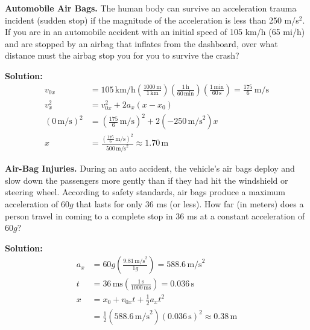 \documentclass[12pt]{article}
\newenvironment{problem}[2][]{
    \begin{trivlist}
        \item[
            {\bfseries #1}
            {\bfseries #2}
        ]
}{\end{trivlist}}
\newcommand{\solution}{\medskip\noindent\textbf{Solution:}}
\newcommand{\unit}[1]{\, \text{#1}}
\newcommand{\m}{\unit{m}}
\newcommand{\km}{\unit{km}}
\newcommand{\kmh}{\unit{km/h}}
\newcommand{\mps}{\unit{m/s}}
\newcommand{\ms}{\unit{ms}}
\newcommand{\s}{\unit{s}}
\newcommand{\Hour}{\unit{h}}
\newcommand{\minute}{\unit{min}}
\begin{document}
\clearpage

\begin{problem}{2.23}
    \textbf{Automobile Air Bags.} The human body can survive an acceleration trauma incident (sudden stop) if the magnitude of the acceleration is less than 250 m/s$^2$.
    If you are in an automobile accident with an initial speed of 105 km/h (65 mi/h) and are stopped by an airbag that inflates from the dashboard, over what distance must the airbag stop you for you to survive the crash?
    
    \solution
    \begin{align}
        v_{0x} &= 105 \kmh \left(\frac{1000 \m}{1 \km}\right) \left(\frac{1 \Hour}{60 \minute}\right) \left(\frac{1 \minute}{60 \s}\right) = \frac{175}{6} \mps \\
        v_x^2 &= v_{0x}^2 + 2a_x \left(x - x_0\right) \\
        \left(0 \mps\right)^2 &= \left(\frac{175}{6} \mps\right)^2 + 2 \left(-250 \mps^2\right) x \\
        x &= \frac{\left(\frac{175}{6} \mps\right)^2}{500 \mps^2} \approx 1.70 \m
    \end{align}
\end{problem}

\bigskip

\begin{problem}{2.25}
    \textbf{Air-Bag Injuries.} During an auto accident, the vehicle's air bags deploy and slow down the passengers more gently than if they had hit the windshield or steering wheel.
    According to safety standards, air bags produce a maximum acceleration of 60$g$ that lasts for only 36 ms (or less). How far (in meters) does a person travel in coming to a complete stop in 36 ms at a constant acceleration of 60$g$?

    \solution
    \begin{align}
        a_x &= 60g \left(\frac{9.81 \mps^2}{1 g}\right) = 588.6 \mps^2 \\
        t &= 36 \ms \left(\frac{1 \s}{1000 \ms}\right) = 0.036 \s \\
        x &= x_0 + v_{0x} t + \frac{1}{2} a_x t^2 \\
        &= \frac{1}{2} \left(588.6 \mps^2\right) \left(0.036 \s\right)^2 \approx 0.38 \m
    \end{align}
\end{problem}

\clearpage
\end{document}
